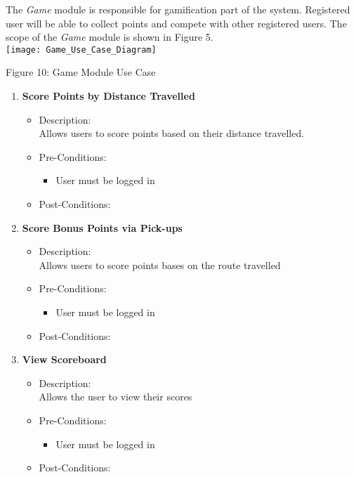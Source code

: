 The \textit{Game} module is responsible for gamification part of the system. Registered user will be able to collect points and compete with other registered users. The scope of the \textit{Game} module is shown in Figure 5.  \\[1cm]

\texttt{[image: Game\_Use\_Case\_Diagram]}
\begin{center}
	Figure 10: Game Module Use Case
\end{center}

\begin{enumerate}
	\item \textbf{Score Points by Distance Travelled}
	\begin{itemize}
		\item Description: \\
		Allows users to score points based on their distance travelled.
		\item Pre-Conditions: \\
		\begin{itemize}
		\item User must be logged in
		
		\end{itemize}
		
		\item Post-Conditions: \\
	
	\end{itemize}
	
	\item \textbf{Score Bonus Points via Pick-ups}
	\begin{itemize}
		\item Description: \\
		Allows users to score points bases on the route travelled
		\item Pre-Conditions: \\
		\begin{itemize}
		\item User must be logged in
		
		\end{itemize}
		
		\item Post-Conditions: \\
	
	\end{itemize}
	
	\item \textbf{View Scoreboard}
	\begin{itemize}
		\item Description: \\
		Allows the user to view their scores
		\item Pre-Conditions: \\
		\begin{itemize}
		\item User must be logged in		
		\end{itemize}
		\item Post-Conditions: \\
	
	\end{itemize}
	
	
\end{enumerate}